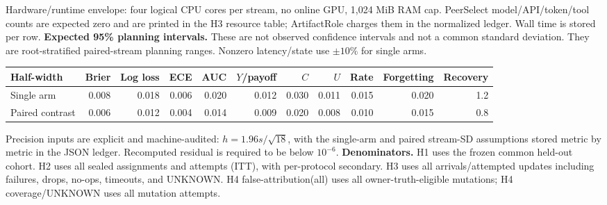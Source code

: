 \documentclass[10pt,a4paper,landscape]{article}
\begin{document}
Hardware/runtime envelope: four logical CPU cores per stream, no online GPU, 1,024 MiB RAM cap. PeerSelect model/API/token/tool counts are expected zero and are printed in the H3 resource table; ArtifactRole charges them in the normalized ledger. Wall time is stored per row.
\textbf{Expected 95\% planning intervals.} These are not observed confidence intervals and not a common standard deviation. They are root-stratified paired-stream planning ranges. Nonzero latency/state use $\pm10\%$ for single arms.
\begin{center}\scriptsize\begin{tabular}{lrrrrrrrrrr}\toprule Half-width & Brier & Log loss & ECE & AUC & $Y$/payoff & $C$ & $U$ & Rate & Forgetting & Recovery \\\midrule Single arm & 0.008 & 0.018 & 0.006 & 0.020 & 0.012 & 0.030 & 0.011 & 0.015 & 0.020 & 1.2 \\ Paired contrast & 0.006 & 0.012 & 0.004 & 0.014 & 0.009 & 0.020 & 0.008 & 0.010 & 0.015 & 0.8 \\\bottomrule\end{tabular}\end{center}
Precision inputs are explicit and machine-audited: $h=1.96s/\sqrt{18}$, with the single-arm and paired stream-SD assumptions stored metric by metric in the JSON ledger. Recomputed residual is required to be below $10^{-6}$.
\textbf{Denominators.} H1 uses the frozen common held-out cohort. H2 uses all sealed assignments and attempts (ITT), with per-protocol secondary. H3 uses all arrivals/attempted updates including failures, drops, no-ops, timeouts, and UNKNOWN. H4 false-attribution(all) uses all owner-truth-eligible mutations; H4 coverage/UNKNOWN uses all mutation attempts.
\end{document}
